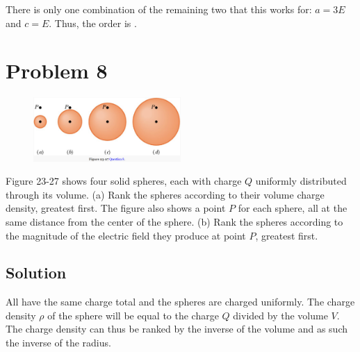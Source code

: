 \documentclass[12pt]{article}
\begin{document}
There is only one combination of the remaining two that this works for: $a = 3E$ and $c = E$. Thus, the order is \boxed{\langle 3\sigma, 2\sigma, \sigma \rangle}.

\pagebreak
\section{Problem 8}
\begin{figure}
    \vspace{-30pt}
    \includegraphics[width=0.5\textwidth]{picture_4.png} 
\end{figure}

Figure 23-27 shows four solid spheres, each with charge $Q$ uniformly distributed through its volume. (a) Rank the spheres according to their volume charge density, greatest first. The figure also shows a point $P$ for each sphere, all at the same distance from the center of the sphere. (b) Rank the spheres according to the magnitude of the electric field they produce at point $P$, greatest first.

\subsection{Solution}
All have the same charge total and the spheres are charged uniformly. 
The charge density \(\rho\) of the sphere will be equal to the charge $Q$ divided by the volume $V$. 
The charge density can thus be ranked by the inverse of the volume and as such the inverse of the radius.
\end{document}
